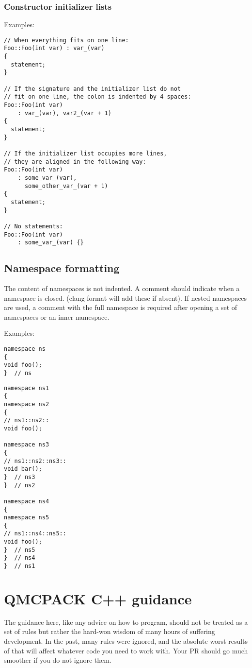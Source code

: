 \subsubsection{Constructor initializer lists}

Examples:
\begin{lstlisting}
// When everything fits on one line:
Foo::Foo(int var) : var_(var) 
{
  statement;
}

// If the signature and the initializer list do not
// fit on one line, the colon is indented by 4 spaces:
Foo::Foo(int var)
    : var_(var), var2_(var + 1)
{
  statement;
}

// If the initializer list occupies more lines,
// they are aligned in the following way:
Foo::Foo(int var)
    : some_var_(var),
      some_other_var_(var + 1) 
{
  statement;
}

// No statements:
Foo::Foo(int var)
    : some_var_(var) {}
\end{lstlisting}

\subsection{Namespace formatting}
The content of namespaces is not indented.
A comment should indicate when a namespace is closed. (clang-format will add these if absent).
If nested namespaces are used, a comment with the full namespace is required after opening a set of namespaces or an inner namespace.

Examples:
\begin{lstlisting}
namespace ns
{
void foo();
}  // ns
\end{lstlisting}

\begin{lstlisting}
namespace ns1
{
namespace ns2
{
// ns1::ns2::
void foo();

namespace ns3
{
// ns1::ns2::ns3::
void bar();
}  // ns3
}  // ns2

namespace ns4
{
namespace ns5
{
// ns1::ns4::ns5::
void foo();
}  // ns5
}  // ns4
}  // ns1
\end{lstlisting}


\section{QMCPACK C++ guidance}
The guidance here, like any advice on how to program, should not be treated as a set of rules but rather the hard-won wisdom of many hours of suffering development. In the past, many rules were ignored, and the absolute worst results of that will affect whatever code you need to work with. Your PR should go much smoother if you do not ignore them.

